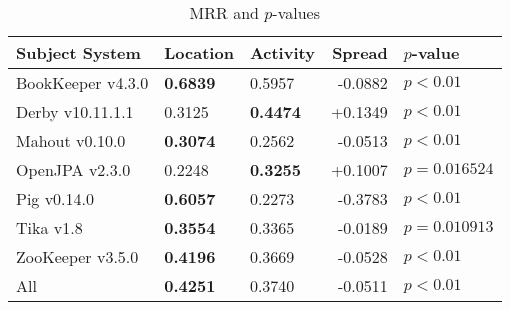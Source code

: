 \begin{table}[t]
\renewcommand{\arraystretch}{1.3}
\footnotesize
\centering
\caption{MRR and $p$-values}
\begin{tabular}{l|llr|l}
\toprule
Subject System & Location & Activity & Spread & $p$-value  \\
\midrule
BookKeeper v4.3.0 & {\bf 0.6839 } & 0.5957 & -0.0882 & $p < 0.01$ \\
Derby v10.11.1.1 & 0.3125 & {\bf 0.4474 } & +0.1349 & $p < 0.01$ \\
Mahout v0.10.0 & {\bf 0.3074 } & 0.2562 & -0.0513 & $p < 0.01$ \\
OpenJPA v2.3.0 & 0.2248 & {\bf 0.3255 } & +0.1007 & $p = 0.016524$ \\
Pig v0.14.0 & {\bf 0.6057 } & 0.2273 & -0.3783 & $p < 0.01$ \\
Tika v1.8 & {\bf 0.3554 } & 0.3365 & -0.0189 & $p = 0.010913$ \\
ZooKeeper v3.5.0 & {\bf 0.4196 } & 0.3669 & -0.0528 & $p < 0.01$ \\
\midrule
All & {\bf 0.4251 } & 0.3740 & -0.0511 & $p < 0.01$ \\
\bottomrule
\end{tabular}
\label{table:rq1:file:lda}
\end{table}
